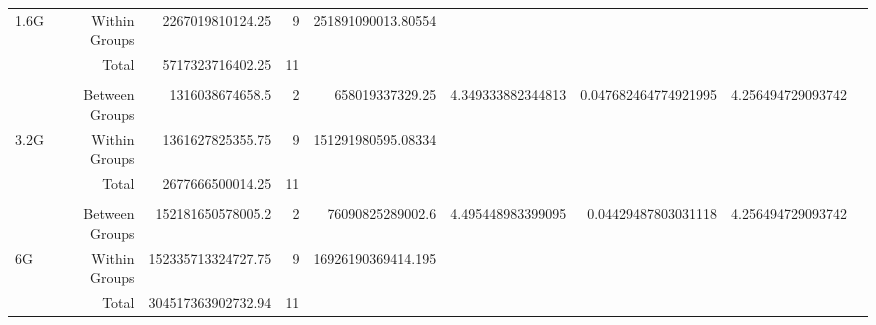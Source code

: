 \begin{landscape}
\begin{table}[!htp]
\begin{tabular}{lrrrrrrrr}
1.6G &Within Groups &2267019810124.25 &9 &251891090013.80554 & & & \\
&Total &5717323716402.25 &11 & & & & \\
& & & & & & & \\
&Between Groups &1316038674658.5 &2 &658019337329.25 &4.349333882344813 &0.047682464774921995 &4.256494729093742 \\
3.2G &Within Groups &1361627825355.75 &9 &151291980595.08334 & & & \\
&Total &2677666500014.25 &11 & & & & \\
& & & & & & & \\
&Between Groups &152181650578005.2 &2 &76090825289002.6 &4.495448983399095 &0.04429487803031118 &4.256494729093742 \\
6G &Within Groups &152335713324727.75 &9 &16926190369414.195 & & & \\
&Total &304517363902732.94 &11 & & & & \\
\bottomrule
\end{tabular}
\end{table}

\end{landscape}

